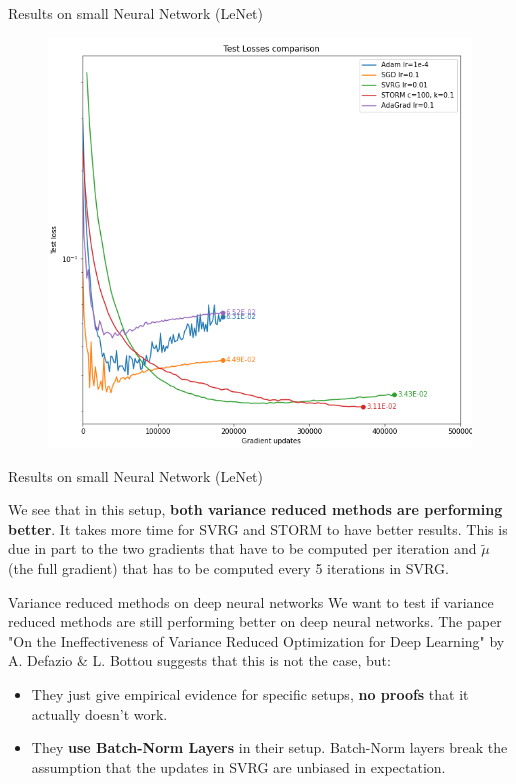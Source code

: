 \documentclass[10pt]{beamer}
\begin{document}
\begin{frame}{Results on small Neural Network (LeNet)}
    \begin{figure}
        \centering
    \includegraphics[scale=0.35]{midterm presentation/images/testLossesMnist.png}
        \label{fig:testLossesMnist}
    \end{figure}   
\end{frame}

\begin{frame}{Results on small Neural Network (LeNet)}

    We see that in this setup, \textbf{both variance reduced methods are performing better}.
    \newline
    It takes more time for SVRG and STORM to have better results. This is due in part to the two gradients that have to be computed per iteration and $\tilde{\mu}$ (the full gradient) that has to be computed every 5 iterations in SVRG.

\end{frame}

\begin{frame}{Variance reduced methods on deep neural networks}
    We want to test if variance reduced methods are still performing better on deep neural networks.
    \newline
    The paper "On the Ineffectiveness of Variance Reduced
    Optimization for Deep Learning" by A. Defazio \& L. Bottou suggests that this is not the case, but:
    \begin{itemize}
        \item They just give empirical evidence for specific setups, \textbf{no proofs} that it actually doesn't work.
        \item They \textbf{use Batch-Norm Layers} in their setup. Batch-Norm layers break the assumption that the updates in SVRG are unbiased in expectation.
    \end{itemize}
\end{frame}
\end{document}
